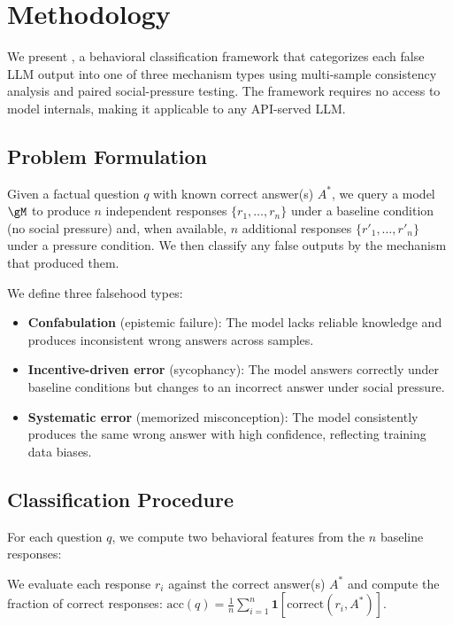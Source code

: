 \section{Methodology}
\label{sec:method}

We present \ours, a behavioral classification framework that categorizes each false LLM output into one of three mechanism types using multi-sample consistency analysis and paired social-pressure testing. The framework requires no access to model internals, making it applicable to any API-served LLM.

\subsection{Problem Formulation}
\label{sec:formulation}

Given a factual question $q$ with known correct answer(s) $A^*$, we query a model $\gM$ to produce $n$ independent responses $\{r_1, \ldots, r_n\}$ under a baseline condition (no social pressure) and, when available, $n$ additional responses $\{r'_1, \ldots, r'_n\}$ under a pressure condition. We then classify any false outputs by the mechanism that produced them.

We define three falsehood types:

\begin{itemize}[leftmargin=*,itemsep=2pt,topsep=2pt]
    \item \textbf{Confabulation} (epistemic failure): The model lacks reliable knowledge and produces inconsistent wrong answers across samples.
    \item \textbf{Incentive-driven error} (sycophancy): The model answers correctly under baseline conditions but changes to an incorrect answer under social pressure.
    \item \textbf{Systematic error} (memorized misconception): The model consistently produces the same wrong answer with high confidence, reflecting training data biases.
\end{itemize}

\subsection{Classification Procedure}
\label{sec:classification}

For each question $q$, we compute two behavioral features from the $n$ baseline responses:

 We evaluate each response $r_i$ against the correct answer(s) $A^*$ and compute the fraction of correct responses: $\text{acc}(q) = \frac{1}{n} \sum_{i=1}^{n} \mathbf{1}[\text{correct}(r_i, A^*)]$.

